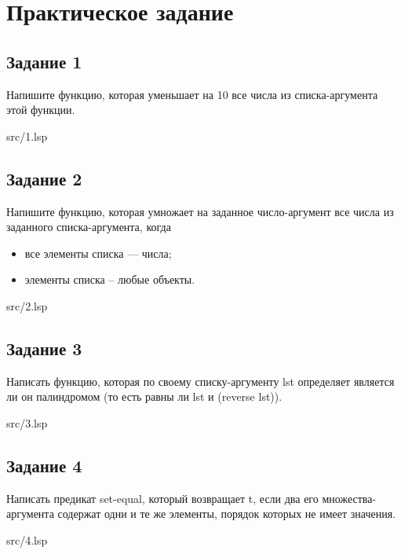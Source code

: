 \chapter*{Практическое задание}

\section*{Задание 1}
Напишите функцию, которая уменьшает на 10 все числа из списка-аргумента этой
функции.

\FloatBarrier
\begin{lstinputlisting}[style={lsp}]{src/1.lsp}
\end{lstinputlisting}
\FloatBarrier

\section*{Задание 2}
Напишите функцию, которая умножает на заданное число-аргумент все числа
из заданного списка-аргумента, когда
\begin{itemize}
	\item все элементы списка --- числа;
	\item элементы списка -- любые объекты.
\end{itemize}

\FloatBarrier
\begin{lstinputlisting}[style={lsp}]{src/2.lsp}
\end{lstinputlisting}
\FloatBarrier

\section*{Задание 3}
Написать функцию, которая по своему списку-аргументу lst определяет
является ли он палиндромом (то есть равны ли lst и (reverse lst)).

\FloatBarrier
\begin{lstinputlisting}[style={lsp}]{src/3.lsp}
\end{lstinputlisting}
\FloatBarrier


\section*{Задание 4}
Написать предикат set-equal, который возвращает t, если два его множества-
аргумента содержат одни и те же элементы, порядок которых не имеет значения.

\FloatBarrier
\begin{lstinputlisting}[style={lsp}]{src/4.lsp}
\end{lstinputlisting}
\FloatBarrier

